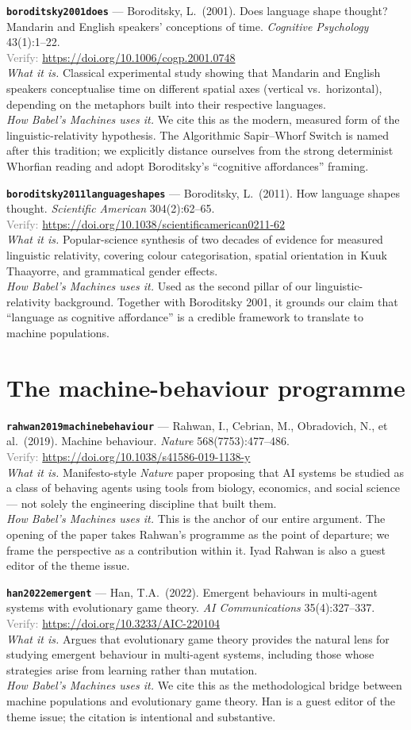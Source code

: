 \documentclass[11pt,a4paper]{article}
\newcommand{\entry}[5]{%
  \par\smallskip
  \noindent\textbf{\texttt{#1}} --- #2\\
  {\footnotesize \textcolor{gray}{Verify:} \url{#3}}\\
  \textit{What it is.} #4\\
  \textit{How Babel's Machines uses it.} #5
  \par\medskip
}
\begin{document}
\entry{boroditsky2001does}
{Boroditsky, L.\ (2001). Does language shape thought? Mandarin and English speakers' conceptions of time. \emph{Cognitive Psychology} 43(1):1--22.}
{https://doi.org/10.1006/cogp.2001.0748}
{Classical experimental study showing that Mandarin and English speakers conceptualise time on different spatial axes (vertical vs.\ horizontal), depending on the metaphors built into their respective languages.}
{We cite this as the modern, measured form of the linguistic-relativity hypothesis. The Algorithmic Sapir--Whorf Switch is named after this tradition; we explicitly distance ourselves from the strong determinist Whorfian reading and adopt Boroditsky's ``cognitive affordances'' framing.}

\entry{boroditsky2011languageshapes}
{Boroditsky, L.\ (2011). How language shapes thought. \emph{Scientific American} 304(2):62--65.}
{https://doi.org/10.1038/scientificamerican0211-62}
{Popular-science synthesis of two decades of evidence for measured linguistic relativity, covering colour categorisation, spatial orientation in Kuuk Thaayorre, and grammatical gender effects.}
{Used as the second pillar of our linguistic-relativity background. Together with Boroditsky 2001, it grounds our claim that ``language as cognitive affordance'' is a credible framework to translate to machine populations.}

\section{The machine-behaviour programme}

\entry{rahwan2019machinebehaviour}
{Rahwan, I., Cebrian, M., Obradovich, N., et al.\ (2019). Machine behaviour. \emph{Nature} 568(7753):477--486.}
{https://doi.org/10.1038/s41586-019-1138-y}
{Manifesto-style \emph{Nature} paper proposing that AI systems be studied as a class of behaving agents using tools from biology, economics, and social science --- not solely the engineering discipline that built them.}
{This is the anchor of our entire argument. The opening of the paper takes Rahwan's programme as the point of departure; we frame the perspective as a contribution within it. Iyad Rahwan is also a guest editor of the theme issue.}

\entry{han2022emergent}
{Han, T.A.\ (2022). Emergent behaviours in multi-agent systems with evolutionary game theory. \emph{AI Communications} 35(4):327--337.}
{https://doi.org/10.3233/AIC-220104}
{Argues that evolutionary game theory provides the natural lens for studying emergent behaviour in multi-agent systems, including those whose strategies arise from learning rather than mutation.}
{We cite this as the methodological bridge between machine populations and evolutionary game theory. Han is a guest editor of the theme issue; the citation is intentional and substantive.}
\end{document}
